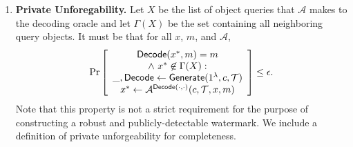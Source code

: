\documentclass[12pt]{article}
\begin{document}
\begin{definition}
\begin{enumerate}
    \item \textbf{Private Unforegability.} Let $X$ be the list of object queries that $\mathcal{A}$ makes to the decoding oracle and let $\Gamma(X)$ be the set containing all neighboring query objects. It must be that for all $x$, $m$, and $\mathcal{A}$,
    \begin{align*}
        \Pr\left[
        \begin{array}{ccc}
            \begin{matrix}
                \mathsf{Decode}(x^*, m) = m \\ 
                \land\ x^* \not\in \Gamma(X): \\
                \textunderscore, \mathsf{Decode} \gets \mathsf{Generate}(1^\lambda, c, \mathcal{T}) \\
                x^* \gets \mathcal{A}^{\mathsf{Decode}(\cdot, \cdot)}(c, \mathcal{T}, x, m) \\
            \end{matrix} \\
        \end{array}
        \right] \leq \epsilon.
    \end{align*}
    Note that this property is not a strict requirement for the purpose of constructing a robust and publicly-detectable watermark.
    We include a definition of private unforgeability for completeness.
\end{enumerate}
\end{definition}
\end{document}
